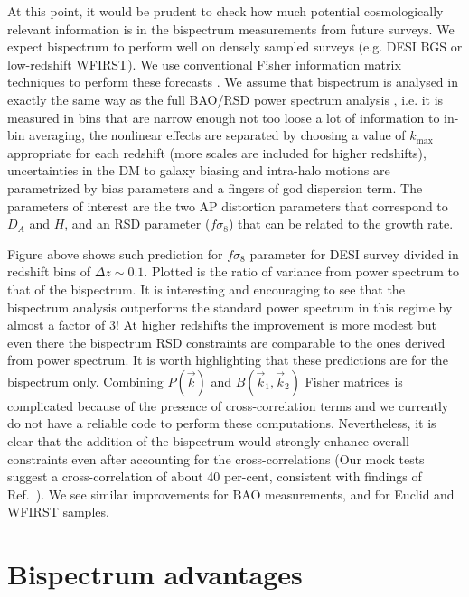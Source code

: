 At this point, it would be prudent to check how much potential cosmologically
relevant information is in the bispectrum measurements from future
surveys. We expect bispectrum to perform well on densely sampled surveys (e.g.
DESI BGS or low-redshift WFIRST). We use conventional Fisher information matrix
techniques to perform these forecasts \cite{2009arXiv0906.0664H,2009arXiv0906.4123C}. We assume that bispectrum is analysed in
exactly the same way as the full BAO/RSD power spectrum analysis \cite{2003ApJ...598..720S,2009MNRAS.397.1348W}, i.e. it is
measured in bins that are narrow enough not too loose a lot of information to
in-bin averaging, the nonlinear effects are separated by choosing a value of
$k_\mathrm{max}$ appropriate for each redshift (more scales are included for
higher redshifts), uncertainties in the DM to galaxy biasing and intra-halo
motions are parametrized by bias parameters and a fingers of god dispersion
term. The parameters of interest are the two AP distortion parameters that
correspond to $D_A$ and $H$, and an RSD parameter ($f\sigma_8$) that can be
related to the growth rate.

Figure above shows such prediction for $f\sigma_8$ parameter for DESI
survey divided in redshift bins of $\Delta z \sim 0.1$. Plotted is the ratio of
variance from power spectrum to that of the bispectrum. It is interesting and
encouraging to see that the bispectrum analysis outperforms the standard power
spectrum in this regime by almost a factor of 3! At higher redshifts the
improvement is more modest but even there the bispectrum RSD constraints are
comparable to the ones derived from power spectrum. It is worth highlighting
that these predictions are for the bispectrum only. Combining $P(\vec{k})$ and
$B(\vec{k}_1,\vec{k}_2)$ Fisher matrices is complicated because of the presence
of cross-correlation terms and we currently do not have a reliable code to
perform these computations. Nevertheless, it is clear that the addition of the
bispectrum would strongly enhance overall constraints even after accounting for
the cross-correlations (Our mock tests suggest a cross-correlation of about 40
per-cent, consistent with findings of Ref.~\cite{2017MNRAS.469.1738S}). We see
similar improvements for BAO measurements, and for Euclid and WFIRST samples.

\section{Bispectrum advantages}

